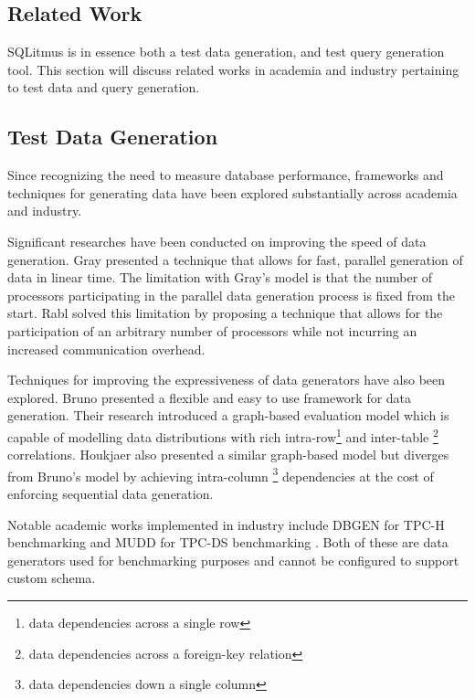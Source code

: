 \documentclass[12pt]{article}
\begin{document}
\begin{spacing}{1.9}
		
		
		
		
		
		
		\section{Related Work}
		SQLitmus is in essence both a test data generation, and test query generation tool. This section will discuss related works in academia and industry pertaining to test data and query generation.
		
		\subsection{Test Data Generation}
		
		Since recognizing the need to measure database performance, frameworks and techniques for generating data have been explored substantially across academia and industry.
		
		Significant researches have been conducted on improving the speed of data generation. Gray \cite{Gray:1994} presented a technique that allows for fast, parallel generation of data in linear time. The limitation with Gray's model is that the number of processors participating in the parallel data generation process is fixed from the start. Rabl \cite{Rabl:2010} solved this limitation by proposing a technique that allows for the participation of an arbitrary number of processors while not incurring an increased communication overhead.
		
		Techniques for improving the expressiveness of data generators have also been explored. Bruno \cite{Bruno:2005} presented a flexible and easy to use framework for data generation. Their research introduced a graph-based evaluation model which is capable of modelling data distributions with rich intra-row\footnote{data dependencies across a single row} and inter-table \footnote{data dependencies across a foreign-key relation} correlations. Houkjaer\cite{Houkjaer:2006} also presented a similar graph-based model but diverges from Bruno's\cite{Bruno:2005} model by achieving intra-column \footnote{data dependencies down a single column} dependencies at the cost of enforcing sequential data generation. 
		
		Notable academic works implemented in industry include DBGEN for TPC-H benchmarking \cite{Poess:2000} and MUDD for TPC-DS benchmarking \cite{Stephens:2004}. Both of these are data generators used for benchmarking purposes and cannot be configured to support custom schema. 
		

\end{spacing}
\end{document}
